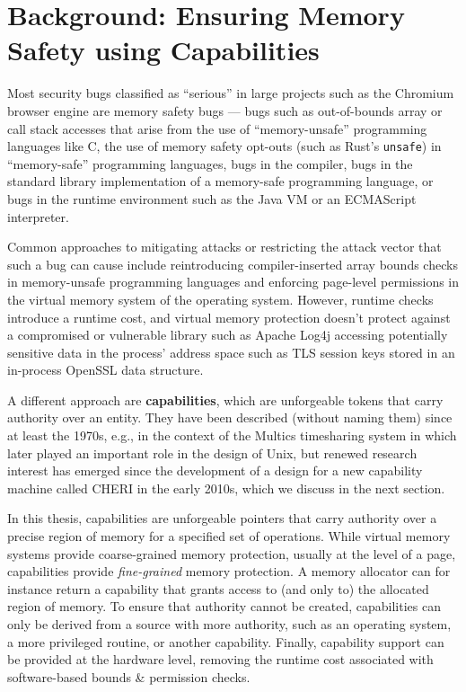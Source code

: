 \documentclass[main.tex]{subfiles}
\begin{document}
\onlyinsubfile{\mainmatter{}}

\chapter{Background: Ensuring Memory Safety using Capabilities} \label{ch:cheri}
Most security bugs classified as \enquote{serious} in large projects such as the Chromium browser engine \cite{chromium} are memory safety bugs — bugs such as out-of-bounds array or call stack accesses that arise from the use of \enquote{memory-unsafe} programming languages like C, the use of memory safety opt-outs (such as Rust’s \texttt{unsafe}) in \enquote{memory-safe} programming languages, bugs in the compiler, bugs in the standard library implementation of a memory-safe programming language, or bugs in the runtime environment such as the Java VM or an ECMAScript interpreter.

Common approaches to mitigating attacks or restricting the attack vector that such a bug can cause include reintroducing compiler-inserted array bounds checks in memory-unsafe programming languages and enforcing page-level permissions in the virtual memory system of the operating system. However, runtime checks introduce a runtime cost, and virtual memory protection doesn’t protect against a compromised or vulnerable library such as Apache Log4j accessing potentially sensitive data in the process’ address space such as TLS session keys stored in an in-process OpenSSL data structure.

A different approach are \textbf{capabilities}, which are unforgeable tokens that carry authority over an entity.\cite[Section~1.1]{capsys} They have been described (without naming them) since at least the 1970s, e.g., in the context of the Multics timesharing system in \cite{multics} which later played an important role in the design of Unix, but renewed research interest has emerged since the development of a design for a new capability machine called CHERI in the early 2010s,\cite[Section~A.1, Chapter~13]{cheri} which we discuss in the next section.

In this thesis, capabilities are unforgeable pointers that carry authority over a precise region of memory for a specified set of operations. While virtual memory systems provide coarse-grained memory protection, usually at the level of a page, capabilities provide \emph{fine-grained} memory protection. A memory allocator can for instance return a capability that grants access to (and only to) the allocated region of memory. To ensure that authority cannot be created, capabilities can only be derived from a source with more authority, such as an operating system, a more privileged routine, or another capability. Finally, capability support can be provided at the hardware level, removing the runtime cost associated with software-based bounds \& permission checks.
\end{document}
